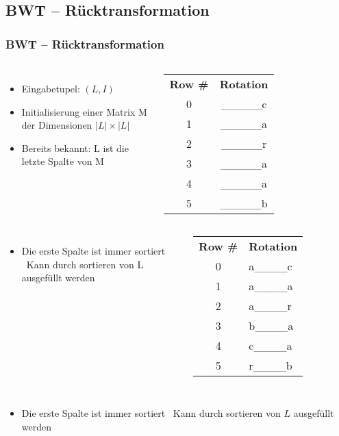 \documentclass[14pt,xcolor=dvipsnames,pdftex]{beamer}
\begin{document}
\subsection{BWT -- Rücktransformation}
\begin{frame}[allowframebreaks]
\frametitle{BWT -- Rücktransformation}
\begin{columns}[c,onlytextwidth]
 \begin{itemize}
  \item Eingabetupel: $(L,I)$
  \item Initialisierung einer Matrix M der Dimensionen $|L| \times |L|$
  \item Bereits bekannt: L ist die {\color{darkgreen}letzte Spalte} von M
 \end{itemize}
    \begin{tabular}{c|c}
    \textbf{Row \#} & \textbf{Rotation} \\
    0 & \_\_\_\_\_{\color{darkgreen}c} \\
    1 & \_\_\_\_\_{\color{darkgreen}a} \\
    2 & \_\_\_\_\_{\color{darkgreen}r} \\
    3 & \_\_\_\_\_{\color{darkgreen}a} \\
    4 & \_\_\_\_\_{\color{darkgreen}a} \\
    5 & \_\_\_\_\_{\color{darkgreen}b} \\
    \end{tabular}
\end{columns}
\framebreak
\begin{columns}[c,onlytextwidth]
 \begin{itemize}
  \item Die {\color{darkgreen}erste Spalte} ist immer sortiert
  \textrightarrow\ Kann durch sortieren von L ausgefüllt werden
 \end{itemize}

    \begin{tabular}{c|l}
    \textbf{Row \#} & \textbf{Rotation} \\
    0 & {\color{darkgreen}a}\_\_\_\_c\\
    1 & {\color{darkgreen}a}\_\_\_\_a\\
    2 & {\color{darkgreen}a}\_\_\_\_r\\
    3 & {\color{darkgreen}b}\_\_\_\_a\\
    4 & {\color{darkgreen}c}\_\_\_\_a\\
    5 & {\color{darkgreen}r}\_\_\_\_b\\
    \end{tabular}
\end{columns}
\framebreak
\begin{columns}[c,onlytextwidth]
 \begin{itemize}
  \item Die {\color{darkgreen}erste Spalte} ist immer sortiert
  \textrightarrow\ Kann durch sortieren von $L$ ausgefüllt werden
 \end{itemize}


\end{columns}
\end{frame}
\end{document}
